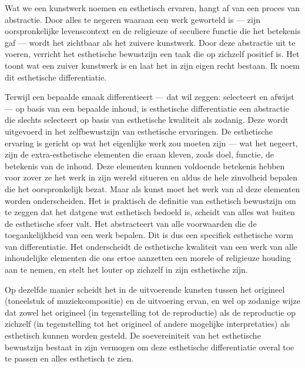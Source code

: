 Wat we een kunstwerk noemen en esthetisch ervaren, hangt af van een proces van abstractie. Door alles te negeren waaraan een werk geworteld is — zijn oorspronkelijke levenscontext en de religieuze of seculiere functie die het betekenis gaf — wordt het zichtbaar als het zuivere kunstwerk. Door deze abstractie uit te voeren, verricht het esthetische bewustzijn een taak die op zichzelf positief is. Het toont wat een zuiver kunstwerk is en laat het in zijn eigen recht bestaan. Ik noem dit esthetische differentiatie.

Terwijl een bepaalde smaak differentieert — dat wil zeggen: selecteert en afwijst — op basis van een bepaalde inhoud, is esthetische differentiatie een abstractie die slechts selecteert op basis van esthetische kwaliteit als zodanig. Deze wordt uitgevoerd in het zelfbewustzijn van esthetische ervaringen. De esthetische ervaring is gericht op wat het eigenlijke werk zou moeten zijn — wat het negeert, zijn de extra-esthetische elementen die eraan kleven, zoals doel, functie, de betekenis van de inhoud. Deze elementen kunnen voldoende betekenis hebben voor zover ze het werk in zijn wereld situeren en aldus de hele zinvolheid bepalen die het oorspronkelijk bezat. Maar als kunst moet het werk van al deze elementen worden onderscheiden. Het is praktisch de definitie van esthetisch bewustzijn om te zeggen dat het datgene wat esthetisch bedoeld is, scheidt van alles wat buiten de esthetische sfeer valt. Het abstracteert van alle voorwaarden die de toegankelijkheid van een werk bepalen. Dit is dus een specifiek esthetische vorm van differentiatie. Het onderscheidt de esthetische kwaliteit van een werk van alle inhoudelijke elementen die ons ertoe aanzetten een morele of religieuze houding aan te nemen, en stelt het louter op zichzelf in zijn esthetische zijn.

Op dezelfde manier scheidt het in de uitvoerende kunsten tussen het origineel (toneelstuk of muziekcompositie) en de uitvoering ervan, en wel op zodanige wijze dat zowel het origineel (in tegenstelling tot de reproductie) als de reproductie op zichzelf (in tegenstelling tot het origineel of andere mogelijke interpretaties) als esthetisch kunnen worden gesteld. De soevereiniteit van het esthetische bewustzijn bestaat in zijn vermogen om deze esthetische differentiatie overal toe te passen en alles esthetisch te zien.

